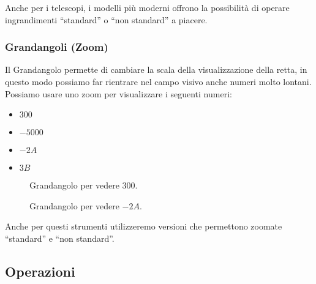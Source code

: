 Anche per i telescopi, i modelli più moderni offrono la possibilità di operare 
ingrandimenti ``standard'' o ``non standard'' a piacere.

\subsubsection{Grandangoli (Zoom)}
\label{subsec:insnum_microscopio}

Il Grandangolo permette di cambiare la scala della visualizzazione della retta, 
in questo modo possiamo far rientrare nel campo visivo anche numeri molto 
lontani.
Possiamo usare uno zoom per visualizzare i seguenti numeri:

\begin{multicols}{4}
\begin{itemize}[nosep]
 \item $300$
 \item $-5000$
 \item $-2A$
 \item $3B$
\end{itemize}
\end{multicols}
\vspace{-5mm}
\begin{figure}[h]
\begin{inaccessibleblock}

\begin{minipage}{.48\linewidth}
 \begin{center}
\grandangoloa
 \end{center}
\caption{Grandangolo per vedere \(300\).} \label{fig:grandangoloa}
\end{minipage}
\hfill
\begin{minipage}{.48\linewidth}
 \begin{center}
\grandangolob
 \end{center}
\caption{Grandangolo per vedere \(-2A\).} \label{fig:grandangolob}
\end{minipage}

\end{inaccessibleblock}
\end{figure}

Anche per questi strumenti utilizzeremo versioni che permettono zoomate 
``standard'' e ``non standard''.

\subsection{Operazioni}
\label{subsec:insnum_operazioni}

